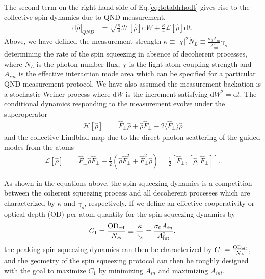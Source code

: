\documentclass[aps,pra,twocolumn,superscriptaddress]{revtex4-1} %
\newcommand{\expect}[1]{\big\langle #1 \big\rangle}
\newcommand{\inter}{{\rm int}}
\begin{document}
The second term on the right-hand side of Eq.\eqref{eq:totaldrhodt} gives rise to the collective spin dynamics due to QND measurement,
\begin{align}
\left.\mathrm{d}\hat{\rho}\right|_{QND} &= \sqrt{\frac{\kappa}{4}}\mathcal{H}\left[\hat{\rho} \right]\mathrm{d}W + \frac{\kappa}{4}\mathcal{L}\left[ \hat{\rho}\right]\mathrm{d}t.
\end{align}
Above, we have defined the measurement strength $\kappa \equiv |\chi|^2\dot{N}_L\equiv \frac{\sigma_0A_{in}}{A_{int}^2}\gamma_s $ determining the rate of the spin squeezing in absence of decoherent processes, where $\dot{N}_L$ is the photon number flux, $\chi$ is the light-atom coupling strength and $A_{int}$ is the effective interaction mode area which can be specified for a particular QND measurement protocol. We have also assumed the measurement backation is a stochastic Weiner process where $\mathrm{d}W$ is the increment satisfying $\mathrm{d}W^2 = \mathrm{d}t$. The conditional dynamics responding to the measurement evolve under the superoperator
\begin{align}
\mathcal{H}\left[ \hat{\rho}\right] &= \hat{F}_\perp\hat{\rho} + \hat{\rho}\hat{F}_\perp -2\expect{\hat{F}_\perp}\hat{\rho}
\end{align}
and the collective Lindblad map due to the direct photon scattering of the guided modes from the atoms
\begin{align}
\mathcal{L}\left[ \hat{\rho} \right] &= \hat{F}_\perp\hat{\rho}\hat{F}_\perp-\frac{1}{2}\left(\hat{\rho}\hat{F}_\perp^2+\hat{F}_\perp^2\hat{\rho} \right)=\frac{1}{2}\left[\hat{F}_\perp,\left[\hat{\rho},\hat{F}_\perp \right] \right].
\end{align}

As shown in the equations above, the spin squeezing dynamics is a competition between the coherent squeezing process and all decoherent processes which are characterized by $\kappa$ and $\gamma_s$, respectively. 
If we define an effective cooperativity or optical depth (OD) per atom quantity for the spin squeezing dynamics by
\begin{align}
C_1=\frac{\mathrm{OD}_{\rm eff}}{N_A} \equiv \frac{\kappa}{\gamma_s}=\frac{\sigma_0A_{in}}{A_{\inter}^2},
\end{align}
the peaking spin squeezing dynamics can then be characterized by $C_1=\frac{\mathrm{OD}_{\rm eff}}{N_A}$, and the geometry of the spin squeezing protocol can then be roughly designed with the goal to maximize $C_1$ by minimizing $A_{in}$ and maximizing $A_{int}$.  
\end{document}
